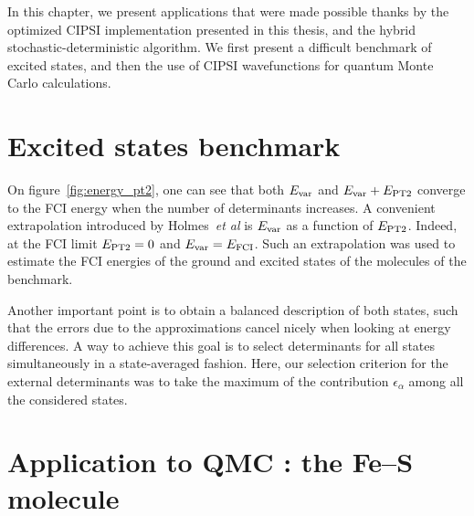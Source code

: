 \documentclass[./thesis.tex]{subfiles}
\begin{document}
\label{chap:APPLICATIONS}

In this chapter, we present applications that were made possible thanks by
the optimized CIPSI implementation presented in this thesis, and the hybrid
stochastic-deterministic algorithm. 
We first present a difficult benchmark of excited states, and then the use
of CIPSI wavefunctions for quantum Monte Carlo calculations.

\section{Excited states benchmark}

On figure~\ref{fig:energy_pt2}, one can see that both $E_\text{var}$ and $E_\text{var}+E_\text{PT2}$
converge to the FCI energy when the number of determinants increases. A
convenient extrapolation introduced by Holmes~\textit{et al}\cite{Holmes_2017} is $E_\text{var}$ as a
function of $E_\text{PT2}$. Indeed, at the FCI limit $E_\text{PT2}=0$ and $E_\text{var}=E_\text{FCI}$.  Such
an extrapolation was used to estimate the FCI energies of the ground and
excited states of the molecules of the benchmark.

Another important point is to obtain a balanced description of both states,
such that the errors due to the approximations cancel nicely when looking at
energy differences. A way to achieve this goal is to select determinants for all
states simultaneously in a state-averaged fashion. Here, our selection criterion
for the external determinants was to take the maximum of the contribution
$\epsilon_\alpha$ among all the considered states.



\section{Application to QMC : the Fe--S molecule}
\end{document}
